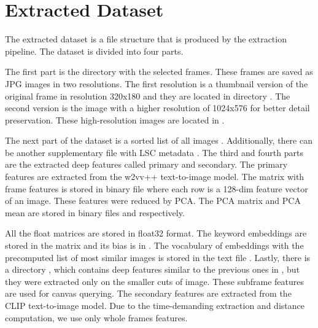 \chapter{Extracted Dataset}
\label{extracted-dataset}


The extracted dataset is a file structure that is produced by the extraction pipeline. The dataset is divided into four parts. 

The first part is the directory  with the selected frames. These frames are saved as JPG images in two resolutions. The first resolution is a thumbnail version of the original frame in resolution 320x180 and they are located in directory . The second version is the image with a higher resolution of 1024x576 for better detail preservation. These high-resolution images are located in . 

The next part of the dataset is a sorted list of all images . Additionally, there can be another supplementary file with LSC metadata . The third and fourth parts are the extracted deep features called primary and secondary. The primary features are extracted from the w2vv++ text-to-image model. The matrix with frame features is stored in binary file  where each row is a 128-dim feature vector of an image. These features were reduced by PCA. The PCA matrix and PCA mean are stored in binary files  and  respectively. 

All the float matrices are stored in float32 format. The keyword embeddings are stored in the matrix  and its bias is in . The vocabulary of embeddings with the precomputed list of most similar images is stored in the text file . Lastly, there is a directory , which contains deep features similar to the previous ones in , but they were extracted only on the smaller cuts of image. These subframe features are used for canvas querying. The secondary features are extracted from the CLIP text-to-image model. Due to the time-demanding extraction and distance computation, we use only whole frames features. 

